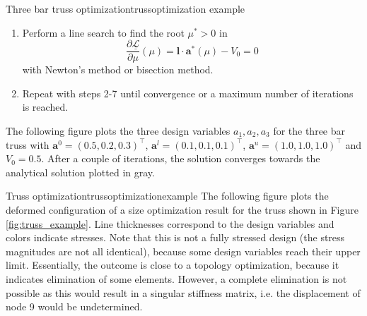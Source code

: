 \begin{example}{Three bar truss optimization}{trussoptimization example}
\begin{enumerate}
\begin{align}
{{                (L^k_j-a^k_j)^2}{\mu l_j}} \\
                \mathbf{a}^* (\mu) &= \max\left(\tilde{\mathbf{a}}^{l,k}, \min \left(\hat{\mathbf{a}}(\mu), \mathbf{a}_u \right)\right)
            \end{align}
            to define the dual function 
            \begin{equation}
                \underline{\mathcal{L}}(\mu) = \mathcal{L}(\mathbf{a}^* (\mu), \mu)
            \end{equation}
        \item Perform a line search to find the root $\mu^*>0$ in 
        \begin{equation}
            \frac{\partial \underline{\mathcal{L}}}{\partial \mu}(\mu) = \mathbf{l} \cdot \mathbf{a}^* (\mu) - V_0 = 0
        \end{equation}
        with Newton's method or bisection method. 
        \item Repeat with steps 2-7 until convergence or a maximum number of iterations is reached.
    \end{enumerate}

    The following figure plots the three design variables $a_1, a_2, a_3$ for the three bar truss with $\mathbf{a}^0=(0.5,0.2,0.3)^\top$, $\mathbf{a}^l=(0.1,0.1,0.1)^\top$, $\mathbf{a}^u=(1.0,1.0,1.0)^\top$ and $V_0=0.5$. After a couple of iterations, the solution converges towards the analytical solution plotted in gray.

    \begin{minipage}{.5\textwidth}
        \centering
        
    \end{minipage}%
    \begin{minipage}{.5\textwidth}
        \centering
        
    \end{minipage}
       
\end{example}

\begin{example}{Truss optimization}{trussoptimizationexample}
    The following figure plots the deformed configuration of a size optimization result for the truss shown in Figure \ref{fig:truss_example}. Line thicknesses correspond to the design variables and colors indicate stresses. Note that this is not a fully stressed design (the stress magnitudes are not all identical), because some design variables reach their upper limit. Essentially, the outcome is close to a topology optimization, because it indicates elimination of some elements. However, a complete elimination is not possible as this would result in a singular stiffness matrix, i.e. the displacement of node 9 would be undetermined. 

    \begin{center}
         
    \end{center}
\end{example}

